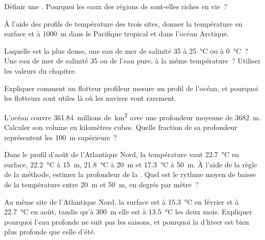 \begin{exercise}[$\star$]\label{exo:g10:layered-ocean:2}
Définir une . Pourquoi les eaux des régions de 
sont-elles riches en vie~?
\end{exercise}

\begin{exercise}[$\star$]\label{exo:g10:layered-ocean:3}
À l'aide des profils de température des trois sites, donner la température
en surface et à \qty{1000}{m} dans le Pacifique tropical et dans l'océan
Arctique.
\end{exercise}

\begin{exercise}[$\star$]\label{exo:g10:layered-ocean:4}
Laquelle est la plus dense, une eau de mer de salinité 35 à
\qty{25}{\degreeCelsius} ou à \qty{0}{\degreeCelsius}~? Une eau de mer de
salinité 35 ou de l'eau pure, à la même température~? Utiliser les valeurs
du chapitre.
\end{exercise}

\begin{exercise}[$\star$]\label{exo:g10:layered-ocean:5}
Expliquer comment un flotteur profileur mesure un profil de l'océan, et
pourquoi les flotteurs sont utiles là où les navires vont rarement.
\end{exercise}

\begin{exercise}[$\star\star$]\label{exo:g10:layered-ocean:6}
L'océan couvre \num{361.84}~millions de~\unit{km^2} avec une profondeur
moyenne de \qty{3682}{m}. Calculer son volume en kilomètres cubes. Quelle
fraction de sa profondeur représentent les \qty{100}{m} supérieurs~?
\end{exercise}

\begin{exercise}[$\star\star$]\label{exo:g10:layered-ocean:7}
Dans le profil d'août de l'Atlantique Nord, la température vaut
\qty{22.7}{\degreeCelsius} en surface, \qty{22.2}{\degreeCelsius} à
\qty{15}{m}, \qty{21.8}{\degreeCelsius} à \qty{20}{m} et
\qty{17.3}{\degreeCelsius} à \qty{50}{m}. À l'aide de la règle de la
méthode, estimer la profondeur de la . Quel est le rythme
moyen de baisse de la température entre \qty{20}{m} et \qty{50}{m}, en
degrés par mètre~?
\end{exercise}

\begin{exercise}[$\star\star$]\label{exo:g10:layered-ocean:8}
Au même site de l'Atlantique Nord, la surface est à
\qty{15.3}{\degreeCelsius} en février et à \qty{22.7}{\degreeCelsius} en
août, tandis qu'à \qty{300}{m} elle est à \qty{13.5}{\degreeCelsius} les
deux mois. Expliquer pourquoi l'eau profonde ne suit pas les saisons, et
pourquoi la  d'hiver est bien plus profonde que celle
d'été.
\end{exercise}

